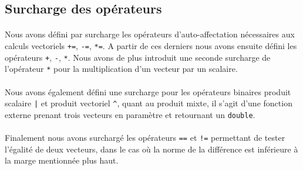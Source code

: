 \documentclass[12pt, letterpaper, twoside]{article}
\begin{document}
\subsection{Surcharge des opérateurs}
\paragraph{}
Nous avons défini par surcharge les opérateurs d'auto-affectation nécessaires aux calculs vectoriels \texttt{+=}, \texttt{-=}, \texttt{*=}. A partir de ces derniers nous avons ensuite défini les opérateurs \texttt{+}, \texttt{-}, \texttt{*}. Nous avons de plus introduit une seconde surcharge de l'opérateur \texttt{*} pour la multiplication d'un vecteur par un scalaire.
\paragraph{}
Nous avons également défini une surcharge pour les opérateurs binaires produit scalaire \texttt{|} et produit vectoriel \texttt{\^}, quant au produit mixte, il s'agit d'une fonction externe prenant trois vecteurs en paramètre et retournant un \texttt{double}.
\paragraph{}
Finalement nous avons surchargé les opérateurs \texttt{==} et \texttt{!=} permettant de tester l'égalité de deux vecteurs, dans le cas où la norme de la différence est inférieure à la marge mentionnée plus haut.
\end{document}

